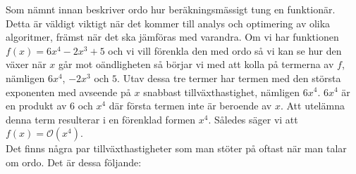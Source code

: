 \documentclass[a4, oneside]{report}
\begin{document}
Som nämnt innan beskriver ordo hur beräkningsmässigt  tung  en  funktionär. Detta är väldigt viktigt när det kommer till analys och optimering av olika algoritmer, främst när det ska jämföras med varandra. Om vi har funktionen $f(x)=6x^4-2x^3+5$ och vi vill förenkla den med ordo så vi kan se hur den växer när $x$ går mot oändligheten så börjar vi med att kolla på termerna av $f$, nämligen $6x^4$, $-2x^3$ och $5$. Utav dessa tre termer har termen med den största exponenten med avseende på $x$ snabbast tillväxthastighet, nämligen $6x^4$. $6x^4$ är en produkt av $6$ och $x^4$ där första termen inte är beroende av $x$. Att utelämna denna term resulterar i en förenklad formen $x^4$. Således säger vi att $f(x)=\mathcal{O}(x^4)$.\\
Det finns några par tillväxthastigheter som man stöter på oftast när man talar om ordo. Det är dessa följande:
\begin{center}
\end{center}
\end{document}
